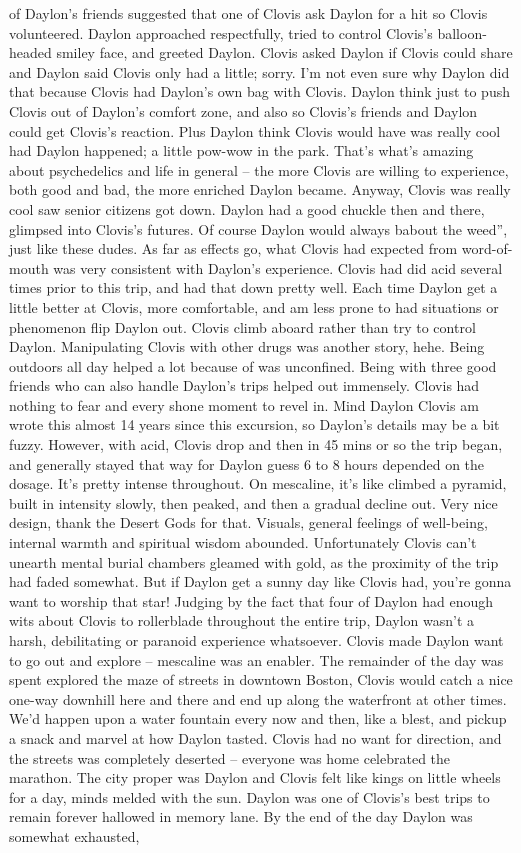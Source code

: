 \documentclass[12pt]{book}
\begin{document}
of Daylon's friends suggested that one of Clovis ask Daylon for a hit so Clovis volunteered. Daylon approached respectfully, tried to control Clovis's balloon-headed smiley face, and greeted Daylon. Clovis asked Daylon if Clovis could share and Daylon said Clovis only had a little; sorry. I'm not even sure why Daylon did that because Clovis had Daylon's own bag with Clovis. Daylon think just to push Clovis out of Daylon's comfort zone, and also so Clovis's friends and Daylon could get Clovis's reaction. Plus Daylon think Clovis would have was really cool had Daylon happened; a little pow-wow in the park. That's what's amazing about psychedelics and life in general -- the more Clovis are willing to experience, both good and bad, the more enriched Daylon became. Anyway, Clovis was really cool saw senior citizens got down. Daylon had a good chuckle then and there, glimpsed into Clovis's futures. Of course Daylon would always babout the weed'', just like these dudes. As far as effects go, what Clovis had expected from word-of-mouth was very consistent with Daylon's experience. Clovis had did acid several times prior to this trip, and had that down pretty well. Each time Daylon get a little better at Clovis, more comfortable, and am less prone to had situations or phenomenon flip Daylon out. Clovis climb aboard rather than try to control Daylon. Manipulating Clovis with other drugs was another story, hehe. Being outdoors all day helped a lot because of was unconfined. Being with three good friends who can also handle Daylon's trips helped out immensely. Clovis had nothing to fear and every shone moment to revel in. Mind Daylon Clovis am wrote this almost 14 years since this excursion, so Daylon's details may be a bit fuzzy. However, with acid, Clovis drop and then in 45 mins or so the trip began, and generally stayed that way for Daylon guess 6 to 8 hours depended on the dosage. It's pretty intense throughout. On mescaline, it's like climbed a pyramid, built in intensity slowly, then peaked, and then a gradual decline out. Very nice design, thank the Desert Gods for that. Visuals, general feelings of well-being, internal warmth and spiritual wisdom abounded. Unfortunately Clovis can't unearth mental burial chambers gleamed with gold, as the proximity of the trip had faded somewhat. But if Daylon get a sunny day like Clovis had, you're gonna want to worship that star! Judging by the fact that four of Daylon had enough wits about Clovis to rollerblade throughout the entire trip, Daylon wasn't a harsh, debilitating or paranoid experience whatsoever. Clovis made Daylon want to go out and explore -- mescaline was an enabler. The remainder of the day was spent explored the maze of streets in downtown Boston, Clovis would catch a nice one-way downhill here and there and end up along the waterfront at other times. We'd happen upon a water fountain every now and then, like a blest, and pickup a snack and marvel at how Daylon tasted. Clovis had no want for direction, and the streets was completely deserted -- everyone was home celebrated the marathon. The city proper was Daylon and Clovis felt like kings on little wheels for a day, minds melded with the sun. Daylon was one of Clovis's best trips to remain forever hallowed in memory lane. By the end of the day Daylon was somewhat exhausted, 
\end{document}
